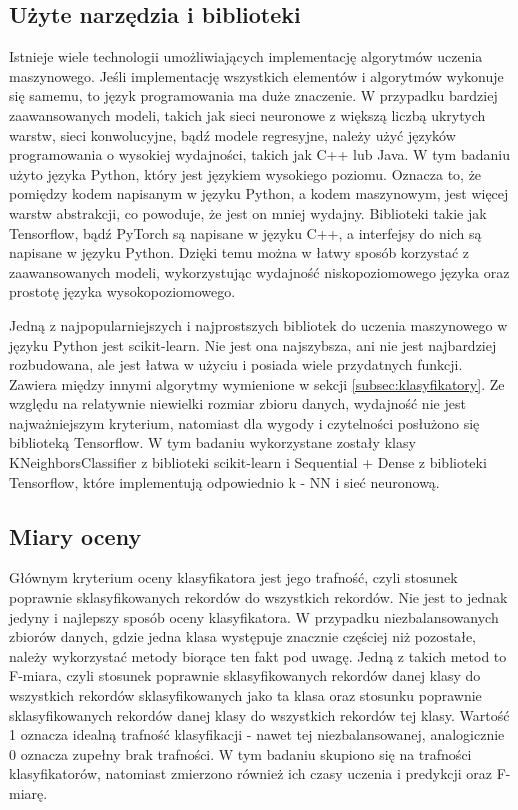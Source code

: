 \subsection{Użyte narzędzia i biblioteki}\label{subsec:narzedziaibiblioteki}
Istnieje wiele technologii umożliwiających implementację algorytmów uczenia maszynowego.
Jeśli implementację wszystkich elementów i algorytmów wykonuje się samemu, to język programowania ma duże znaczenie.
W przypadku bardziej zaawansowanych modeli, takich jak sieci neuronowe z większą liczbą ukrytych warstw, sieci konwolucyjne, bądź modele regresyjne,
należy użyć języków programowania o wysokiej wydajności, takich jak C++ lub Java. W tym badaniu użyto języka Python, który jest językiem wysokiego poziomu.
Oznacza to, że pomiędzy kodem napisanym w języku Python, a kodem maszynowym, jest więcej warstw abstrakcji, co powoduje, że jest on mniej wydajny.
Biblioteki takie jak Tensorflow, bądź PyTorch są napisane w języku C++, a interfejsy do nich są napisane w języku Python. Dzięki temu można w łatwy sposób korzystać z zaawansowanych modeli,
wykorzystując wydajność niskopoziomowego języka oraz prostotę języka wysokopoziomowego.

Jedną z najpopularniejszych i najprostszych bibliotek do uczenia maszynowego w języku Python jest scikit-learn\cite{scikit-learn}. Nie jest ona najszybsza, ani nie jest najbardziej rozbudowana,
ale jest łatwa w użyciu i posiada wiele przydatnych funkcji. Zawiera między innymi algorytmy wymienione w sekcji \ref{subsec:klasyfikatory}. Ze względu na relatywnie niewielki rozmiar zbioru danych,
wydajność nie jest najważniejszym kryterium, natomiast dla wygody i czytelności posłużono się biblioteką Tensorflow. W tym badaniu wykorzystane zostały klasy KNeighborsClassifier z biblioteki scikit-learn i Sequential + Dense z biblioteki Tensorflow, które implementują odpowiednio k - NN i sieć neuronową.

\subsection{Miary oceny}\label{subsec:miaryoceny}
Głównym kryterium oceny klasyfikatora jest jego trafność, czyli stosunek poprawnie sklasyfikowanych rekordów do wszystkich rekordów.
Nie jest to jednak jedyny i najlepszy sposób oceny klasyfikatora. W przypadku niezbalansowanych zbiorów danych, gdzie jedna klasa występuje znacznie częściej niż pozostałe,
należy wykorzystać metody biorące ten fakt pod uwagę. Jedną z takich metod to F-miara, czyli stosunek poprawnie sklasyfikowanych rekordów danej klasy do wszystkich rekordów sklasyfikowanych
jako ta klasa oraz stosunku poprawnie sklasyfikowanych rekordów danej klasy do wszystkich rekordów tej klasy. Wartość 1 oznacza idealną trafność klasyfikacji - nawet tej niezbalansowanej, 
analogicznie 0 oznacza zupełny brak trafności. W tym badaniu skupiono się na trafności klasyfikatorów, natomiast zmierzono również ich czasy uczenia i predykcji oraz F-miarę.